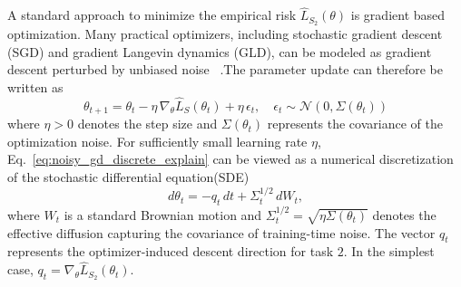 \documentclass{article}
\begin{document}
A standard approach to minimize the empirical risk $\hat L_{S_2}(\theta)$ is gradient based optimization.
Many practical optimizers, including stochastic gradient descent (SGD) and gradient Langevin dynamics (GLD), can be modeled as gradient descent perturbed by unbiased noise ~\cite{zhu2019anisotropicnoisestochasticgradient}.The parameter update can therefore be written as
\begin{equation}
\theta_{t+1}
=
\theta_t
-
\eta\,\nabla_{\theta} \hat L_S(\theta_t)
+
\eta\,\epsilon_t,
\quad \epsilon_t\sim \mathcal{N}(0,\Sigma(\theta_t))
\label{eq:noisy_gd_discrete_explain}
\end{equation}
where $\eta>0$ denotes the step size and $\Sigma(\theta_t)$ represents the covariance of the optimization noise.
For sufficiently small learning rate $\eta$, Eq.~\eqref{eq:noisy_gd_discrete_explain} can be viewed as a numerical discretization of the stochastic differential equation(SDE)
\begin{equation}
d\theta_t
=
- q_t\,dt
+
\Sigma_t^{1/2}\,dW_t,
\label{eq:noisy_gd_sde_explain}
\end{equation}
where $W_t$ is a standard Brownian motion and $\Sigma_t^{1/2} = \sqrt{\eta\Sigma(\theta_t)}$ denotes the effective diffusion capturing the covariance of training-time noise.
The vector $q_t$ represents the optimizer-induced descent direction for task $2$. In the simplest case, $q_t=\nabla_{\theta} \hat L_{S_2}(\theta_t)$.
\end{document}
